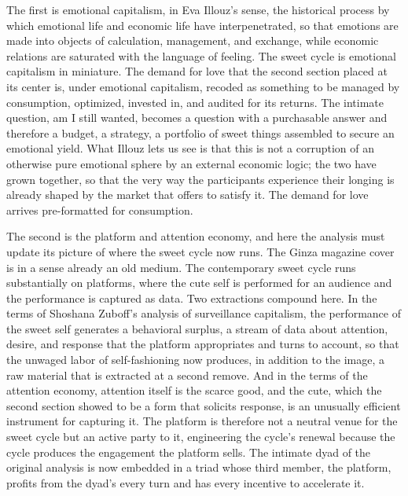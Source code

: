 \documentclass[11pt,a4paper]{article}
\begin{document}
The first is emotional capitalism, in Eva Illouz's sense, the historical process by which emotional life and economic life have interpenetrated, so that emotions are made into objects of calculation, management, and exchange, while economic relations are saturated with the language of feeling. The sweet cycle is emotional capitalism in miniature. The demand for love that the second section placed at its center is, under emotional capitalism, recoded as something to be managed by consumption, optimized, invested in, and audited for its returns. The intimate question, am I still wanted, becomes a question with a purchasable answer and therefore a budget, a strategy, a portfolio of sweet things assembled to secure an emotional yield. What Illouz lets us see is that this is not a corruption of an otherwise pure emotional sphere by an external economic logic; the two have grown together, so that the very way the participants experience their longing is already shaped by the market that offers to satisfy it. The demand for love arrives pre-formatted for consumption.

The second is the platform and attention economy, and here the analysis must update its picture of where the sweet cycle now runs. The Ginza magazine cover is in a sense already an old medium. The contemporary sweet cycle runs substantially on platforms, where the cute self is performed for an audience and the performance is captured as data. Two extractions compound here. In the terms of Shoshana Zuboff's analysis of surveillance capitalism, the performance of the sweet self generates a behavioral surplus, a stream of data about attention, desire, and response that the platform appropriates and turns to account, so that the unwaged labor of self-fashioning now produces, in addition to the image, a raw material that is extracted at a second remove. And in the terms of the attention economy, attention itself is the scarce good, and the cute, which the second section showed to be a form that solicits response, is an unusually efficient instrument for capturing it. The platform is therefore not a neutral venue for the sweet cycle but an active party to it, engineering the cycle's renewal because the cycle produces the engagement the platform sells. The intimate dyad of the original analysis is now embedded in a triad whose third member, the platform, profits from the dyad's every turn and has every incentive to accelerate it.
\end{document}
